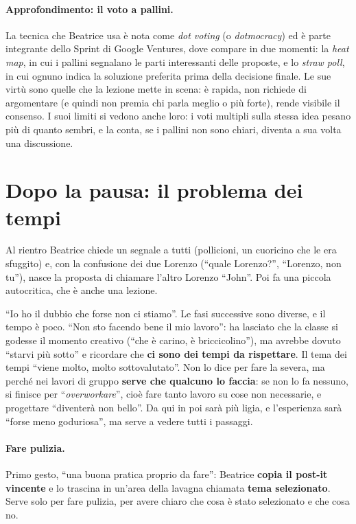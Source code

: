 \paragraph{Approfondimento: il voto a pallini.} La tecnica che Beatrice usa è nota come
\emph{dot voting} (o \emph{dotmocracy}) ed è parte integrante dello Sprint di Google
Ventures, dove compare in due momenti: la \emph{heat map}, in cui i pallini segnalano le
parti interessanti delle proposte, e lo \emph{straw poll}, in cui ognuno indica la
soluzione preferita prima della decisione finale. Le sue
virtù sono quelle che la lezione mette in scena: è rapida, non richiede di
argomentare (e quindi non premia chi parla meglio o più forte), rende visibile il
consenso. I suoi limiti si vedono anche loro: i voti multipli sulla stessa idea
pesano più di quanto sembri, e la conta, se i pallini non sono chiari, diventa a sua
volta una discussione.

\section{Dopo la pausa: il problema dei tempi}
\label{a7:sec:tempi}

Al rientro Beatrice chiede un segnale a tutti (pollicioni, un cuoricino che le era
sfuggito) e, con la confusione dei due Lorenzo (``quale Lorenzo?'', ``Lorenzo, non
tu''), nasce la proposta di chiamare l'altro Lorenzo ``John''. Poi fa una piccola
autocritica, che è anche una lezione.

``Io ho il dubbio che forse non ci stiamo''. Le fasi successive sono diverse, e il
tempo è poco. ``Non sto facendo bene il mio lavoro'': ha lasciato che la classe si
godesse il momento creativo (``che è carino, è briccicolino''), ma avrebbe dovuto
``starvi più sotto'' e ricordare che \textbf{ci sono dei tempi da rispettare}. Il
tema dei tempi ``viene molto, molto sottovalutato''. Non lo dice per fare la severa,
ma perché nei lavori di gruppo \textbf{serve che qualcuno lo faccia}: se non lo fa
nessuno, si finisce per ``\emph{overworkare}'', cioè fare tanto lavoro su cose non
necessarie, e progettare ``diventerà non bello''. Da qui in poi sarà più ligia, e
l'esperienza sarà ``forse meno goduriosa'', ma serve a vedere tutti i passaggi.

\paragraph{Fare pulizia.} Primo gesto, ``una buona pratica proprio da fare'':
Beatrice \textbf{copia il post-it vincente} e lo trascina in un'area della lavagna
chiamata \textbf{tema selezionato}. Serve solo per fare pulizia, per avere chiaro che
cosa è stato selezionato e che cosa no.

